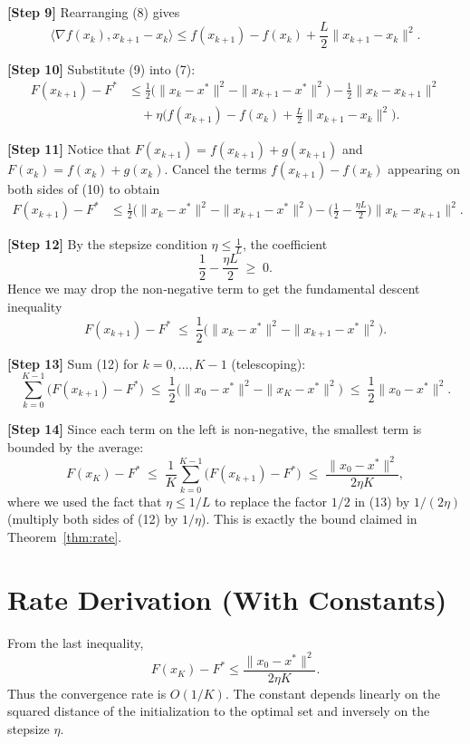 \documentclass[11pt]{article}
\begin{document}
\noindent\textbf{[Step 9]} Rearranging (8) gives
\[
\langle\nabla f(x_{k}),x_{k+1}-x_{k}\rangle
\le f(x_{k+1})-f(x_{k})+\frac{L}{2}\|x_{k+1}-x_{k}\|^{2}.
\tag{9}
\]

\noindent\textbf{[Step 10]} Substitute (9) into (7):
\[
\begin{aligned}
F(x_{k+1})-F^{*}
&\le \frac12\big(\|x_{k}-x^{*}\|^{2}-\|x_{k+1}-x^{*}\|^{2}\big)
   -\frac12\|x_{k}-x_{k+1}\|^{2}\\
&\quad +\eta\Big(f(x_{k+1})-f(x_{k})+\frac{L}{2}\|x_{k+1}-x_{k}\|^{2}\Big).
\end{aligned}
\tag{10}
\]

\noindent\textbf{[Step 11]} Notice that $F(x_{k+1})=f(x_{k+1})+g(x_{k+1})$ and $F(x_{k})=f(x_{k})+g(x_{k})$. Cancel the terms $f(x_{k+1})-f(x_{k})$ appearing on both sides of (10) to obtain
\[
\begin{aligned}
F(x_{k+1})-F^{*}
&\le \frac12\big(\|x_{k}-x^{*}\|^{2}-\|x_{k+1}-x^{*}\|^{2}\big)
   -\Big(\frac12-\frac{\eta L}{2}\Big)\|x_{k}-x_{k+1}\|^{2}.
\end{aligned}
\tag{11}
\]

\noindent\textbf{[Step 12]} By the stepsize condition $\eta\le\frac{1}{L}$, the coefficient
\[
\frac12-\frac{\eta L}{2}\;\ge\;0.
\]
Hence we may drop the non‑negative term to get the fundamental descent inequality
\[
F(x_{k+1})-F^{*}\;\le\;\frac12\big(\|x_{k}-x^{*}\|^{2}-\|x_{k+1}-x^{*}\|^{2}\big).
\tag{12}
\]

\noindent\textbf{[Step 13]} Sum (12) for $k=0,\dots,K-1$ (telescoping):
\[
\sum_{k=0}^{K-1}\big(F(x_{k+1})-F^{*}\big)
\;\le\;\frac12\big(\|x_{0}-x^{*}\|^{2}-\|x_{K}-x^{*}\|^{2}\big)
\;\le\;\frac12\|x_{0}-x^{*}\|^{2}.
\tag{13}
\]

\noindent\textbf{[Step 14]} Since each term on the left is non‑negative, the smallest term is bounded by the average:
\[
F(x_{K})-F^{*}\;\le\;\frac{1}{K}\sum_{k=0}^{K-1}\big(F(x_{k+1})-F^{*}\big)
\;\le\;\frac{\|x_{0}-x^{*}\|^{2}}{2\eta K},
\]
where we used the fact that $\eta\le 1/L$ to replace the factor $1/2$ in (13) by $1/(2\eta)$ (multiply both sides of (12) by $1/\eta$). This is exactly the bound claimed in Theorem~\ref{thm:rate}.

\section*{Rate Derivation (With Constants)}
From the last inequality,
\[
F(x_{K})-F^{*}
\le \frac{\|x_{0}-x^{*}\|^{2}}{2\eta K}.
\]
Thus the convergence rate is $O(1/K)$. The constant depends linearly on the squared distance of the initialization to the optimal set and inversely on the stepsize $\eta$.
\end{document}
